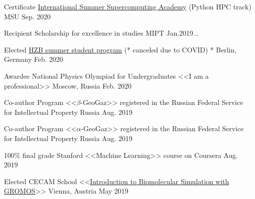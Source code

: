 
\begin{cvhonors}

  \cvhonor
    {Certificate} %
    {\href{http://academy.hpc-russia.ru/en/organizers}{International Summer Supercomputing Academy} (Python HPC track)} %
    {MSU} %
    {Sep. 2020} %

  \cvhonor
    {Recipient} %
    {Scholarship for excellence in studies} %
    {MIPT} %
    {Jan.2019...} %
        
  \cvhonor
    {Elected} %
    {\href{https://www.helmholtz-berlin.de/jobskarriere/sommerstudenten/index_en.html}{HZB summer student program} (* canceled due to COVID)} %
    {* Berlin, Germany} %
    {Feb. 2020} %
    
  \cvhonor
    {Awardee} %
    {National Physics Olympiad for Undergraduates <<I am a professional>>} %
    {Moscow, Russia} %
    {Feb. 2020} %
    
  \cvhonor
    {Co-author} %
    {Program <<$\beta$-GeoGaz>> registered in the Russian Federal Service for Intellectual Property} %
    {Russia} %
    {Aug. 2019} %
            
  \cvhonor
    {Co-author} %
    {Program <<$\alpha$-GeoGaz>> registered in the Russian Federal Service for Intellectual Property} %
    {Russia} %
    {Aug. 2019} %
    
  \cvhonor
    {100\% final grade} %
    {Stanford <<Machine Learning>> course on Coursera} %
    {} %
    {Aug. 2019} %
    
  \cvhonor
    {Elected} %
    {CECAM School <<\href{https://www.cecam.org/workshop-details/129}{Introduction to Biomolecular Simulation with GROMOS}>>} %
    {Vienna, Austria} %
    {May 2019} %
    

\end{cvhonors}
